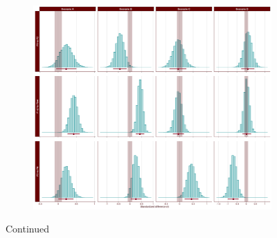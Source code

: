 \begin{appendix}
\medskip

\begin{figure}[ht]\ContinuedFloat
    \centering
    \begin{subfigure}{1\textwidth}
        \includegraphics[width=\linewidth]{Figures/SE2_last_scenario_comparisons_D.png}
        \label{fig:last-scenario-comparisons-D}
    \end{subfigure}
    \caption[]{Continued}
    \label{fig:last-scenario-comparisons}
\end{figure}
\end{appendix}
